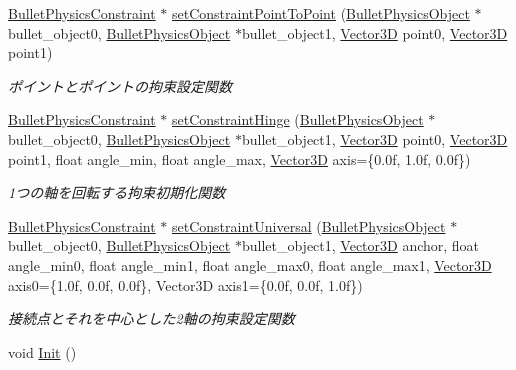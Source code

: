 \begin{DoxyCompactItemize}
\mbox{\hyperlink{class_bullet_physics_constraint}{Bullet\+Physics\+Constraint}} $\ast$ \mbox{\hyperlink{class_bullet_physics_manager_a5e68fcd1f23812a7c87708266ee20353}{set\+Constraint\+Point\+To\+Point}} (\mbox{\hyperlink{class_bullet_physics_object}{Bullet\+Physics\+Object}} $\ast$bullet\+\_\+object0, \mbox{\hyperlink{class_bullet_physics_object}{Bullet\+Physics\+Object}} $\ast$bullet\+\_\+object1, \mbox{\hyperlink{class_vector3_d}{Vector3D}} point0, \mbox{\hyperlink{class_vector3_d}{Vector3D}} point1)
\begin{DoxyCompactList}\small\item\em ポイントとポイントの拘束設定関数 \end{DoxyCompactList}\item 
\mbox{\hyperlink{class_bullet_physics_constraint}{Bullet\+Physics\+Constraint}} $\ast$ \mbox{\hyperlink{class_bullet_physics_manager_a7f022644ccafde7e87497f90b1efec07}{set\+Constraint\+Hinge}} (\mbox{\hyperlink{class_bullet_physics_object}{Bullet\+Physics\+Object}} $\ast$bullet\+\_\+object0, \mbox{\hyperlink{class_bullet_physics_object}{Bullet\+Physics\+Object}} $\ast$bullet\+\_\+object1, \mbox{\hyperlink{class_vector3_d}{Vector3D}} point0, \mbox{\hyperlink{class_vector3_d}{Vector3D}} point1, float angle\+\_\+min, float angle\+\_\+max, \mbox{\hyperlink{class_vector3_d}{Vector3D}} axis=\{0.\+0f, 1.\+0f, 0.\+0f\})
\begin{DoxyCompactList}\small\item\em 1つの軸を回転する拘束初期化関数 \end{DoxyCompactList}\item 
\mbox{\hyperlink{class_bullet_physics_constraint}{Bullet\+Physics\+Constraint}} $\ast$ \mbox{\hyperlink{class_bullet_physics_manager_a0c57ac980c9c2e6b582fa7033bd55848}{set\+Constraint\+Universal}} (\mbox{\hyperlink{class_bullet_physics_object}{Bullet\+Physics\+Object}} $\ast$bullet\+\_\+object0, \mbox{\hyperlink{class_bullet_physics_object}{Bullet\+Physics\+Object}} $\ast$bullet\+\_\+object1, \mbox{\hyperlink{class_vector3_d}{Vector3D}} anchor, float angle\+\_\+min0, float angle\+\_\+min1, float angle\+\_\+max0, float angle\+\_\+max1, \mbox{\hyperlink{class_vector3_d}{Vector3D}} axis0=\{1.\+0f, 0.\+0f, 0.\+0f\}, Vector3\+D axis1=\{0.\+0f, 0.\+0f, 1.\+0f\})
\begin{DoxyCompactList}\small\item\em 接続点とそれを中心とした2軸の拘束設定関数 \end{DoxyCompactList}\item 
void \mbox{\hyperlink{class_bullet_physics_manager_a9e68a60ba0017f5479cf3a21ce4a5703}{Init}} ()

\end{DoxyCompactItemize}
